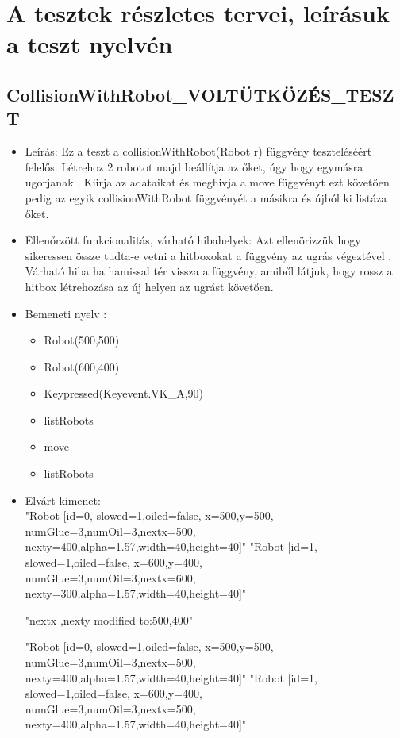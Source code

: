 \section{A tesztek részletes tervei, leírásuk a teszt nyelvén}

\subsection{CollisionWithRobot\_VOLTÜTKÖZÉS\_TESZT}
\begin{itemize}
	\item Leírás: Ez a teszt a collisionWithRobot(Robot r) függvény teszteléséért felelős.
			Létrehoz 2 robotot majd beállítja az őket, úgy hogy egymásra ugorjanak .
			Kiirja az adataikat  és meghivja a move függvényt ezt követően pedig az egyik collisionWithRobot függvényét a másikra	és újból ki listáza őket.	\newline
	\item Ellenőrzött funkcionalitás, várható hibahelyek: Azt ellenörizzük hogy sikeressen össze tudta-e vetni a hitboxokat a függvény az ugrás végeztével .
	Várható hiba ha hamissal tér vissza a függvény, amiből látjuk, hogy rossz a hitbox létrehozása az új helyen az ugrást követően.
	\item Bemeneti nyelv :
		\begin{itemize}
		\item Robot(500,500)
		\item Robot(600,400)
		\item Keypressed(Keyevent.VK\_A,90)
		\item listRobots
		\item move
		\item listRobots
		\end{itemize}

	\item Elvárt kimenet: \\
		"Robot [id=0,  slowed=1,oiled=false, x=500,y=500, 
		\\numGlue=3,numOil=3,nextx=500,
		\\nexty=400,alpha=1.57,width=40,height=40]"\newline
		"Robot [id=1,  slowed=1,oiled=false, x=600,y=400, 
		\\numGlue=3,numOil=3,nextx=600,
		\\nexty=300,alpha=1.57,width=40,height=40]"
		
		"nextx ,nexty modified to:500,400"
	
		"Robot [id=0,  slowed=1,oiled=false, x=500,y=500, 
		\\numGlue=3,numOil=3,nextx=500,
		\\nexty=400,alpha=1.57,width=40,height=40]"\newline
		"Robot [id=1,  slowed=1,oiled=false, x=600,y=400, 
		\\numGlue=3,numOil=3,nextx=500,
		\\nexty=400,alpha=1.57,width=40,height=40]"


\end{itemize}
